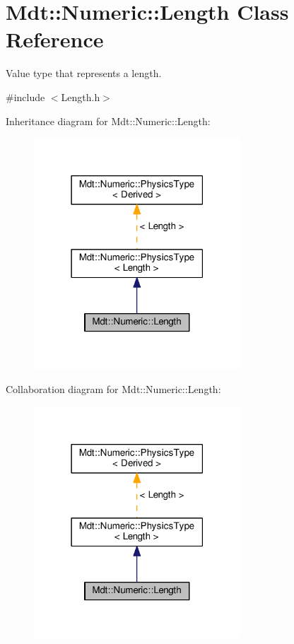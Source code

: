 \hypertarget{class_mdt_1_1_numeric_1_1_length}{}\section{Mdt\+:\+:Numeric\+:\+:Length Class Reference}
\label{class_mdt_1_1_numeric_1_1_length}


Value type that represents a length.  




{\ttfamily \#include $<$Length.\+h$>$}



Inheritance diagram for Mdt\+:\+:Numeric\+:\+:Length\+:
\nopagebreak
\begin{figure}[H]
\begin{center}
\leavevmode
\includegraphics[width=219pt]{class_mdt_1_1_numeric_1_1_length__inherit__graph}
\end{center}
\end{figure}


Collaboration diagram for Mdt\+:\+:Numeric\+:\+:Length\+:
\nopagebreak
\begin{figure}[H]
\begin{center}
\leavevmode
\includegraphics[width=219pt]{class_mdt_1_1_numeric_1_1_length__coll__graph}
\end{center}
\end{figure}
